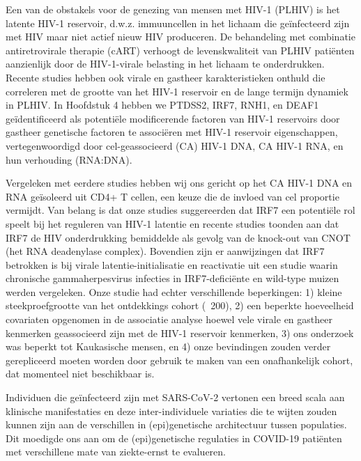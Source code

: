 \documentclass{book}
\begin{document}
\begin{refsection}
Een van de obstakels voor de genezing van mensen met HIV-1 (PLHIV) is het latente HIV-1 reservoir, d.w.z. immuuncellen in het lichaam die geïnfecteerd zijn met HIV maar niet actief nieuw HIV produceren.
De behandeling met combinatie antiretrovirale therapie (cART) verhoogt de levenskwaliteit van PLHIV patiënten aanzienlijk door de HIV-1-virale belasting in het lichaam te onderdrukken.
Recente studies hebben ook virale en gastheer karakteristieken onthuld die correleren met de grootte van het HIV-1 reservoir en de lange termijn dynamiek in PLHIV. 
In Hoofdstuk 4 hebben we PTDSS2, IRF7, RNH1, en DEAF1 geïdentificeerd als potentiële modificerende factoren van HIV-1 reservoirs door gastheer genetische factoren te associëren met HIV-1 reservoir eigenschappen, vertegenwoordigd door cel-geassocieerd (CA) HIV-1 DNA, CA HIV-1 RNA, en hun verhouding (RNA:DNA).

Vergeleken met eerdere studies hebben wij ons gericht op het CA HIV-1 DNA en RNA geïsoleerd uit CD4+ T cellen, een keuze die de invloed van cel proportie vermijdt.
Van belang is dat onze studies suggereerden dat IRF7 een potentiële rol speelt bij het reguleren van HIV-1 latentie en recente studies toonden aan dat IRF7 de HIV onderdrukking bemiddelde als gevolg van de knock-out van CNOT (het RNA deadenylase complex).
Bovendien zijn er aanwijzingen dat IRF7 betrokken is bij virale latentie-initialisatie en reactivatie uit een studie waarin chronische gammaherpesvirus infecties in IRF7-deficiënte en wild-type muizen werden vergeleken.
Onze studie had echter verschillende beperkingen: 1) kleine steekproefgrootte van het ontdekkings cohort (~200), 2) een beperkte hoeveelheid covariaten opgenomen in de associatie analyse hoewel vele virale en gastheer kenmerken geassocieerd zijn met de HIV-1 reservoir kenmerken, 3) ons onderzoek was beperkt tot Kaukasische mensen, en 4) onze bevindingen zouden verder gerepliceerd moeten worden door gebruik te maken van een onafhankelijk cohort, dat momenteel niet beschikbaar is.

Individuen die geïnfecteerd zijn met SARS-CoV-2 vertonen een breed scala aan klinische manifestaties en deze inter-individuele variaties die te wijten zouden kunnen zijn aan de verschillen in (epi)genetische architectuur tussen populaties.
Dit moedigde ons aan om de (epi)genetische regulaties in COVID-19 patiënten met verschillene mate van ziekte-ernst te evalueren.


\end{refsection}
\end{document}
